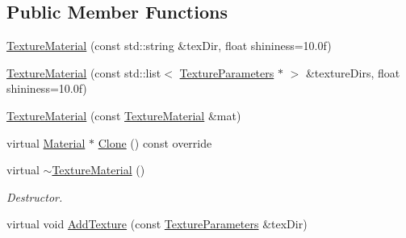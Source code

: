 \subsection*{Public Member Functions}
\begin{DoxyCompactItemize}
\item 
\mbox{\hyperlink{class_geometry_engine_1_1_geometry_material_1_1_texture_material_a90a61577a2d5b13b91809bcaea97dae7}{Texture\+Material}} (const std\+::string \&tex\+Dir, float shininess=10.\+0f)
\item 
\mbox{\hyperlink{class_geometry_engine_1_1_geometry_material_1_1_texture_material_af6c96a0f976b0ed3d558d7d395ec35b2}{Texture\+Material}} (const std\+::list$<$ \mbox{\hyperlink{class_geometry_engine_1_1_geometry_material_1_1_texture_parameters}{Texture\+Parameters}} $\ast$ $>$ \&texture\+Dirs, float shininess=10.\+0f)
\item 
\mbox{\hyperlink{class_geometry_engine_1_1_geometry_material_1_1_texture_material_a60678cd8338eeae2996e72b1d96a2364}{Texture\+Material}} (const \mbox{\hyperlink{class_geometry_engine_1_1_geometry_material_1_1_texture_material}{Texture\+Material}} \&mat)
\item 
virtual \mbox{\hyperlink{class_geometry_engine_1_1_geometry_material_1_1_material}{Material}} $\ast$ \mbox{\hyperlink{class_geometry_engine_1_1_geometry_material_1_1_texture_material_ace905cf02deb41ad8aa422ef2fb9070f}{Clone}} () const override
\item 
\mbox{\label{class_geometry_engine_1_1_geometry_material_1_1_texture_material_a9c7189b0ae8bd8c5325b527d31492bf7}} 
virtual \mbox{\hyperlink{class_geometry_engine_1_1_geometry_material_1_1_texture_material_a9c7189b0ae8bd8c5325b527d31492bf7}{$\sim$\+Texture\+Material}} ()
\begin{DoxyCompactList}\small\item\em Destructor. \end{DoxyCompactList}\item 
\mbox{\label{class_geometry_engine_1_1_geometry_material_1_1_texture_material_a8e8feb88aebfe46bbf5a9cb14222236e}} 
virtual void \mbox{\hyperlink{class_geometry_engine_1_1_geometry_material_1_1_texture_material_a8e8feb88aebfe46bbf5a9cb14222236e}{Add\+Texture}} (const \mbox{\hyperlink{class_geometry_engine_1_1_geometry_material_1_1_texture_parameters}{Texture\+Parameters}} \&tex\+Dir)

\end{DoxyCompactItemize}

